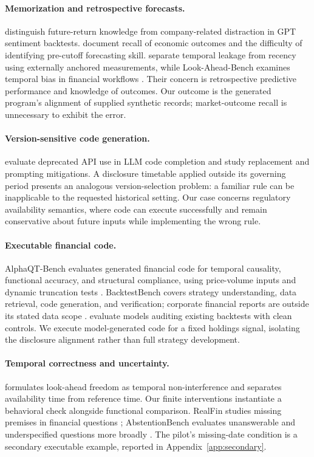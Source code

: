 \documentclass[10pt,twocolumn,a4paper]{article}
\begin{document}
\paragraph{Memorization and retrospective forecasts.}
\citet{glasserman2023} distinguish future-return knowledge from company-related distraction in GPT sentiment backtests. \citet{lopezlira2025} document recall of economic outcomes and the difficulty of identifying pre-cutoff forecasting skill. \citet{zhang2026leakage} separate temporal leakage from recency using externally anchored measurements, while Look-Ahead-Bench examines temporal bias in financial workflows \citep{benhenda2026}. Their concern is retrospective predictive performance and knowledge of outcomes. Our outcome is the generated program's alignment of supplied synthetic records; market-outcome recall is unnecessary to exhibit the error.

\paragraph{Version-sensitive code generation.}
\citet{wang2025apis} evaluate deprecated API use in LLM code completion and study replacement and prompting mitigations. A disclosure timetable applied outside its governing period presents an analogous version-selection problem: a familiar rule can be inapplicable to the requested historical setting. Our case concerns regulatory availability semantics, where code can execute successfully and remain conservative about future inputs while implementing the wrong rule.

\paragraph{Executable financial code.}
AlphaQT-Bench evaluates generated financial code for temporal causality, functional accuracy, and structural compliance, using price-volume inputs and dynamic truncation tests \citep{luo2026alphaqt}. BacktestBench covers strategy understanding, data retrieval, code generation, and verification; corporate financial reports are outside its stated data scope \citep{wang2026backtest}. \citet{ulesov2026rigged} evaluate models auditing existing backtests with clean controls. We execute model-generated code for a fixed holdings signal, isolating the disclosure alignment rather than full strategy development.

\paragraph{Temporal correctness and uncertainty.}
\citet{fonseca2026temporal} formulates look-ahead freedom as temporal non-interference and separates availability time from reference time. Our finite interventions instantiate a behavioral check alongside functional comparison. RealFin studies missing premises in financial questions \citep{dai2026realfin}; AbstentionBench evaluates unanswerable and underspecified questions more broadly \citep{kirichenko2025abstention}. The pilot's missing-date condition is a secondary executable example, reported in Appendix~\ref{app:secondary}.
\end{document}
